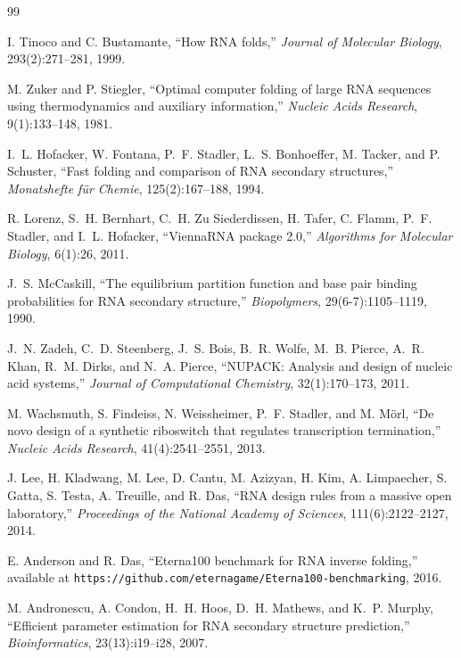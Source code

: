 \documentclass[11pt,a4paper]{article}
\begin{document}

\begin{thebibliography}{99}

I. Tinoco and C. Bustamante,
``How RNA folds,''
\emph{Journal of Molecular Biology}, 293(2):271--281, 1999.

M. Zuker and P. Stiegler,
``Optimal computer folding of large RNA sequences using thermodynamics and auxiliary information,''
\emph{Nucleic Acids Research}, 9(1):133--148, 1981.

I.~L. Hofacker, W. Fontana, P.~F. Stadler, L.~S. Bonhoeffer, M. Tacker, and P. Schuster,
``Fast folding and comparison of RNA secondary structures,''
\emph{Monatshefte f\"ur Chemie}, 125(2):167--188, 1994.

R. Lorenz, S.~H. Bernhart, C.~H. Zu Siederdissen, H. Tafer, C. Flamm, P.~F. Stadler, and I.~L. Hofacker,
``{ViennaRNA} package 2.0,''
\emph{Algorithms for Molecular Biology}, 6(1):26, 2011.

J.~S. McCaskill,
``The equilibrium partition function and base pair binding probabilities for RNA secondary structure,''
\emph{Biopolymers}, 29(6-7):1105--1119, 1990.

J.~N. Zadeh, C.~D. Steenberg, J.~S. Bois, B.~R. Wolfe, M.~B. Pierce, A.~R. Khan, R.~M. Dirks, and N.~A. Pierce,
``{NUPACK}: Analysis and design of nucleic acid systems,''
\emph{Journal of Computational Chemistry}, 32(1):170--173, 2011.

M. Wachsmuth, S. Findeiss, N. Weissheimer, P.~F. Stadler, and M. M\"orl,
``De novo design of a synthetic riboswitch that regulates transcription termination,''
\emph{Nucleic Acids Research}, 41(4):2541--2551, 2013.

J. Lee, H. Kladwang, M. Lee, D. Cantu, M. Azizyan, H. Kim, A. Limpaecher, S. Gatta, S. Testa, A. Treuille, and R. Das,
``RNA design rules from a massive open laboratory,''
\emph{Proceedings of the National Academy of Sciences}, 111(6):2122--2127, 2014.

E. Anderson and R. Das,
``{Eterna100} benchmark for RNA inverse folding,''
available at \texttt{https://github.com/eternagame/Eterna100-benchmarking}, 2016.

M. Andronescu, A. Condon, H.~H. Hoos, D.~H. Mathews, and K.~P. Murphy,
``Efficient parameter estimation for RNA secondary structure prediction,''
\emph{Bioinformatics}, 23(13):i19--i28, 2007.


\end{thebibliography}
\end{document}
